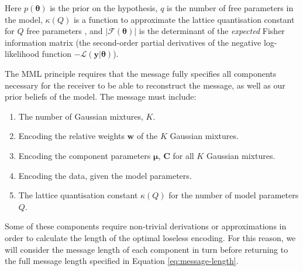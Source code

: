 \documentclass{aastex61}
\newcommand{\vect}[1]{\boldsymbol{\mathbf{#1}}}
\def\veccov{\vect{C}}
\def\vecmean{\vect{\mu}}
\def\vectheta{\vect{\theta}}
\def\weight{w}
\def\weights{\vect{\weight}}
\def\datum{y}
\def\data{\vect{\datum}}
\def\likelihood{\mathcal{L}}
\begin{document}
Here $p(\vectheta)$ is the prior on the hypothesis, $q$ is the number of free
parameters in the model, $\kappa\left(Q\right)$ is a function to approximate the lattice
quantisation constant for $Q$ free parameters \citep[e.g.,][]{Conway_1984}, 
and $|\mathcal{F}\left(\vectheta\right)|$ is the determinant of the 
\emph{expected} Fisher information matrix (the second-order partial 
derivatives of the negative log-likelihood function 
$-\likelihood(\data|\vectheta)$).







The MML principle requires that the message fully specifies all components
necessary for the receiver to be able to reconstruct the message, as well as
our prior beliefs of the model.
The message must include:



\begin{enumerate}
  \item The number of Gaussian mixtures, $K$.
  \item Encoding the relative weights $\weights$ of the $K$ Gaussian mixtures.
  \item Encoding the component parameters $\vecmean$, $\veccov$ for all $K$
        Gaussian mixtures.
  \item Encoding the data, given the model parameters.
  \item The lattice quantisation constant $\kappa(Q)$ for the number of model
        parameters $Q$.
\end{enumerate}

Some of these components require non-trivial derivations or approximations in
order to calculate the length of the optimal loseless encoding. 
For this reason, we will consider the message length of each component in turn
before returning to the full message length specified in Equation \ref{eq:message-length}.
\end{document}
